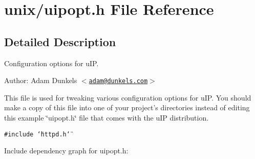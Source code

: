 \hypertarget{a00058}{
\section{unix/uipopt.h File Reference}
\label{a00058}
}


\subsection{Detailed Description}
Configuration options for u\-IP. 

\begin{Desc}
\item[Author:]Adam Dunkels $<$\href{mailto:adam@dunkels.com}{\tt adam@dunkels.com}$>$\end{Desc}
This file is used for tweaking various configuration options for u\-IP. You should make a copy of this file into one of your project's directories instead of editing this example \char`\"{}uipopt.h\char`\"{} file that comes with the u\-IP distribution. 

{\tt \#include \char`\"{}httpd.h\char`\"{}}\par


Include dependency graph for uipopt.h:

